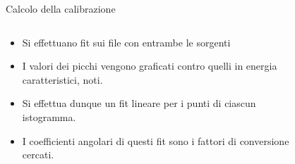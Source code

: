 \documentclass [xcolor=svgnames] {beamer}
\begin{document}
\begin{frame}{Calcolo della calibrazione}
	\begin{columns}
		\begin{column}{0.4\textwidth}
			\begin{itemize}
				\item<1-> Si effettuano fit sui file con entrambe le sorgenti
				\item<2-> I valori dei picchi vengono graficati contro quelli in energia caratteristici, noti.
				\item<4-> Si effettua dunque un fit lineare per i punti di ciascun istogramma.
				\item<5-> I coefficienti angolari di questi fit sono i fattori di conversione cercati.
			\end{itemize}
		\end{column}
		\begin{column}{0.5\textwidth}
			\begin{figure}
				\centering
			\end{figure}
		\end{column}
	\end{columns}
	
\end{frame}
\end{document}
